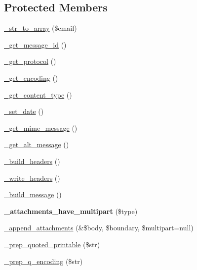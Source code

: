 \subsection*{Protected Members}
\begin{DoxyCompactItemize}
\item 
\mbox{\hyperlink{class_c_i___email_a64cd83e470ede0781d028d7198474d1c}{\+\_\+str\+\_\+to\+\_\+array}} (\$email)
\item 
\mbox{\hyperlink{class_c_i___email_a253c34263736465755f85ec4192aa6b4}{\+\_\+get\+\_\+message\+\_\+id}} ()
\item 
\mbox{\hyperlink{class_c_i___email_ad0000c693b4b2768f56fcc1049f8b3c7}{\+\_\+get\+\_\+protocol}} ()
\item 
\mbox{\hyperlink{class_c_i___email_ab7a90b9198c0384a2a330728f2c78ebd}{\+\_\+get\+\_\+encoding}} ()
\item 
\mbox{\hyperlink{class_c_i___email_a0df0801e489187b9f8108ec776f98f2e}{\+\_\+get\+\_\+content\+\_\+type}} ()
\item 
\mbox{\hyperlink{class_c_i___email_a0c25effa0066e09273d092572709f6eb}{\+\_\+set\+\_\+date}} ()
\item 
\mbox{\hyperlink{class_c_i___email_a2211ba669bd8d076041d4e72bc8a9c59}{\+\_\+get\+\_\+mime\+\_\+message}} ()
\item 
\mbox{\hyperlink{class_c_i___email_a1a87461e94ab7466b7b6f22682c4a055}{\+\_\+get\+\_\+alt\+\_\+message}} ()
\item 
\mbox{\hyperlink{class_c_i___email_a5dbec091c7efce89395a40e460b75d49}{\+\_\+build\+\_\+headers}} ()
\item 
\mbox{\hyperlink{class_c_i___email_a6bde7269215bc1093811ae098bb034bf}{\+\_\+write\+\_\+headers}} ()
\item 
\mbox{\hyperlink{class_c_i___email_a9ddc60e529eb909ff0879781a6f296ff}{\+\_\+build\+\_\+message}} ()
\item 
\mbox{\label{class_c_i___email_ae652360ac4267d201218921f46b77df7}} 
{\bfseries \+\_\+attachments\+\_\+have\+\_\+multipart} (\$type)
\item 
\mbox{\hyperlink{class_c_i___email_a24b79594abe7528b9207c3dad7494f70}{\+\_\+append\+\_\+attachments}} (\&\$body, \$boundary, \$multipart=null)
\item 
\mbox{\hyperlink{class_c_i___email_af2beda05a0ab5d0ec65b03da633b1d33}{\+\_\+prep\+\_\+quoted\+\_\+printable}} (\$str)
\item 
\mbox{\hyperlink{class_c_i___email_a56a4d842c3dfe77bcb41082a82c5df24}{\+\_\+prep\+\_\+q\+\_\+encoding}} (\$str)

\end{DoxyCompactItemize}
